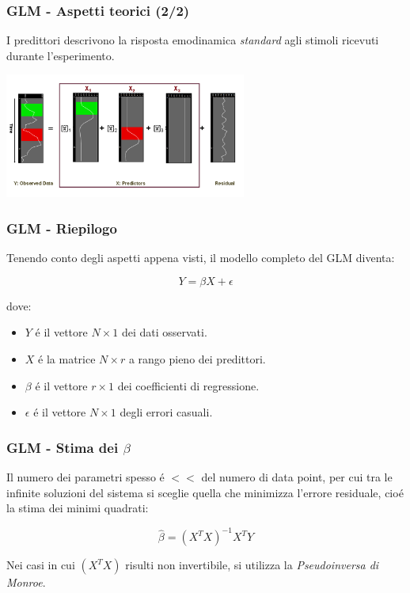 \documentclass{beamer}
\begin{document}
\begin{frame}
\frametitle{GLM - Aspetti teorici (2/2)}
I \alert{predittori} descrivono la risposta emodinamica \emph{standard} agli stimoli ricevuti durante l'esperimento.

\includegraphics[keepaspectratio, width = 300px]{Images/glm_visual.png}
\end{frame}

\begin{frame}
\frametitle{GLM - Riepilogo}
Tenendo conto degli aspetti appena visti, il modello completo del GLM diventa:

$$Y = \beta X + \epsilon$$

dove:
\begin{itemize}
\item $Y$ \'e il vettore $N \times 1 $ dei dati osservati.
\item $X$ \'e la matrice $N \times r$ a rango pieno dei predittori.
\item $\beta$ \'e il vettore $r \times 1$ dei coefficienti di regressione.
\item $\epsilon$ \'e il vettore $N \times 1$ degli errori casuali.
\end{itemize}
\end{frame}

\begin{frame}
\frametitle{GLM - Stima dei $\beta$}
Il numero dei parametri spesso \'e $<<$ del numero di data point, per cui tra le infinite soluzioni del sistema si sceglie quella che minimizza l'errore residuale, cio\'e la \alert{stima dei minimi quadrati}:

$$ 	\hat{\beta} = (X^TX)^{-1} X^TY$$

Nei casi in cui $(X^TX)$ risulti non invertibile, si utilizza la \emph{Pseudoinversa di Monroe}.
\end{frame}
\end{document}
